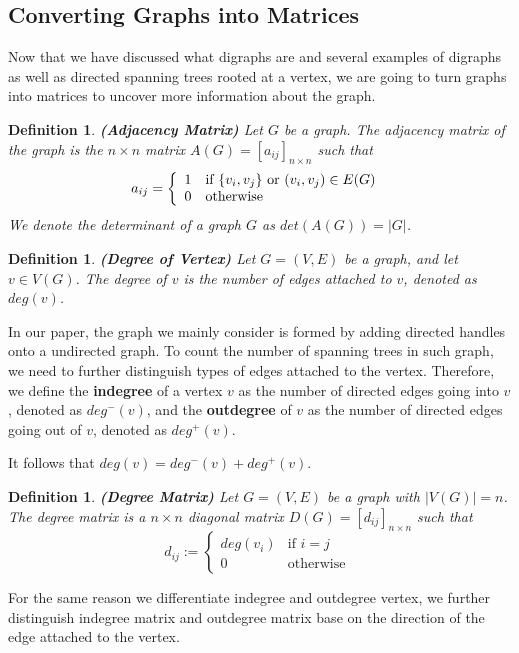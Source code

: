 \documentclass[twoside,11pt]{article}
\newtheorem{definition}[theorem]{Definition}
\numberwithin{equation}{section} \DeclareMathOperator{\Var}{Var}
\newcommand{\bdf}{\begin{definition}}
\newcommand{\edf}{\end{definition}}
\begin{document}
\subsection{Converting Graphs into Matrices}
Now that we have discussed what digraphs are and several examples of digraphs as well as directed spanning trees rooted at a vertex, we are going to turn graphs into matrices to uncover more information about the graph.
\bdf
{\bf (Adjacency Matrix)}
Let $G$ be a graph. The {\it adjacency matrix} of the graph is the
$n \times n$ matrix $A(G) = [a_{ij}]_{n \times n}$
such that
\begin{displaymath}
a_{ij} =  \left\{\begin{array}{ll} 1 & \textrm{if $ \{v_i, v_j\} \textrm{ or } (v_i,v_j) \in E(G)$ }
 \\ 0 & \textrm{otherwise }
\end{array}\right.
\end{displaymath}
We denote {\it the determinant of a graph} $G$ as $det(A(G))=|G|$.
\edf

\bdf
{\bf (Degree of Vertex)}
Let $G=(V,E)$ be a graph, and let $v\in V(G)$.
The {\it degree} of \(v\) is the number of edges attached to \(v\), denoted as \(deg(v)\).
\edf
In our paper, the graph we mainly consider is formed by adding directed handles onto a undirected graph. To count the number of spanning trees in such graph, we need to further distinguish types of edges attached to the vertex. Therefore, we define
the {\bf indegree} of a vertex \(v\) as the number of  directed edges going into \(v\), denoted as \(deg^{-}(v)\), and 
the {\bf outdegree} of \(v\) as the number of directed edges going out of \(v\), denoted as \(deg^{+}(v)\). 

It follows that \(deg(v)=deg^{-}(v)+deg^{+}(v)\).

\bdf
{\bf (Degree Matrix)}
Let $G=(V,E)$ be a graph with $|V(G)|=n$. The {\it degree matrix} is a $n\times n$ diagonal matrix $D(G) = [d_{ij}]_{n \times n}$ such that
\begin{displaymath}
d_{ij} :=  \left\{\begin{array}{ll} deg(v_i) & \textrm{if $i=j$ }
 \\ 0 & \textrm{otherwise }
\end{array}\right.
\end{displaymath}
\edf
For the same reason we differentiate indegree and outdegree vertex, we further distinguish indegree matrix and outdegree matrix base on the direction of the edge attached to the vertex. 
\end{document}
